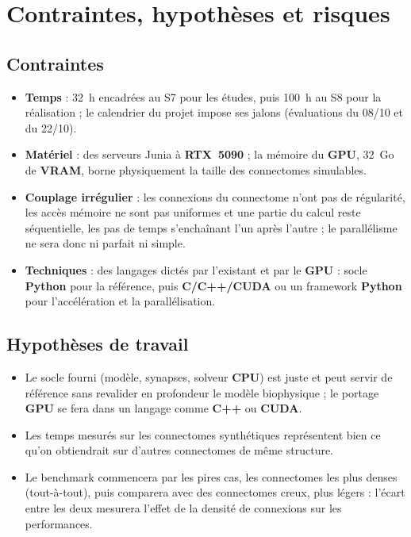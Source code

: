 \chapter{Contraintes, hypothèses et risques}

\section{Contraintes}

\begin{itemize}
    \item \textbf{Temps} : 32~h encadrées au S7 pour les études, puis 100~h au S8 pour la réalisation ; le calendrier du projet impose ses jalons (évaluations du 08/10 et du 22/10).
    \item \textbf{Matériel} : des serveurs Junia à \textbf{RTX~5090} ; la mémoire du \textbf{GPU}, 32~Go de \textbf{VRAM}, borne physiquement la taille des connectomes simulables.
    \item \textbf{Couplage irrégulier} : les connexions du connectome n'ont pas de régularité, les accès mémoire ne sont pas uniformes et une partie du calcul reste séquentielle, les pas de temps s'enchaînant l'un après l'autre ; le parallélisme ne sera donc ni parfait ni simple.
    \item \textbf{Techniques} : des langages dictés par l'existant et par le \textbf{GPU} : socle \textbf{Python} pour la référence, puis \textbf{C/C++/CUDA} ou un framework \textbf{Python} pour l'accélération et la parallélisation.
\end{itemize}

\section{Hypothèses de travail}

\begin{itemize}
    \item Le socle fourni (modèle, synapses, solveur \textbf{CPU}) est juste et peut servir de référence sans revalider en profondeur le modèle biophysique ; le portage \textbf{GPU} se fera dans un langage comme \textbf{C++} ou \textbf{CUDA}.
    \item Les temps mesurés sur les connectomes synthétiques représentent bien ce qu'on obtiendrait sur d'autres connectomes de même structure.
    \item Le benchmark commencera par les pires cas, les connectomes les plus denses (tout-à-tout), puis comparera avec des connectomes creux, plus légers : l'écart entre les deux mesurera l'effet de la densité de connexions sur les performances.
\end{itemize}

